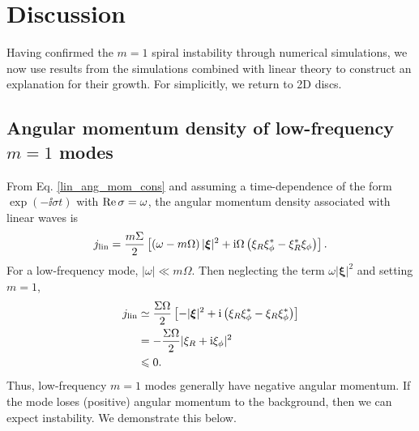 \section{Discussion}\label{discussions} 
Having confirmed the $m=1$ spiral instability through numerical
simulations, we now use results from the simulations combined with
linear theory to construct an explanation for their growth. For
simplicitly, we return to 2D discs. 




\subsection{Angular momentum density of  low-frequency $m=1$ modes}
From Eq. \ref{lin_ang_mom_cons} and assuming a time-dependence of the
form $\exp{(-\ii \sigma t)}$ with $\operatorname{Re}{\sigma} = \omega$,  
the angular momentum density associated with linear waves is
\begin{align}
  j_\mathrm{lin} = \frac{m\Sigma}{2}\left[\left(\omega -
      m\Omega\right)|\bm{\xi}|^2 + \mathrm{i}\Omega\left(\xi_R\xi_\phi^* -
      \xi_R^*\xi_\phi\right)\right].  
\end{align}
For a low-frequency mode, $|\omega|\ll m\Omega$. Then neglecting the
term $\omega|\bm{\xi}|^2$ and setting $m=1$,
\begin{align}
  j_\mathrm{lin} &\simeq \frac{\Sigma\Omega}{2}\left[-|\bm{\xi}|^2 + \mathrm{i}\left(\xi_R\xi_\phi^* -
      \xi_R\xi_\phi^*\right)\right]\notag\\
  & = -\frac{\Sigma\Omega}{2}|\xi_R + \mathrm{i}\xi_\phi|^2\notag\\
  & \leqslant 0.
\end{align}
Thus, low-frequency $m=1$ modes generally have negative
angular momentum. If the mode loses (positive) angular momentum
to the background, then we can expect instability. We demonstrate
this below. 

